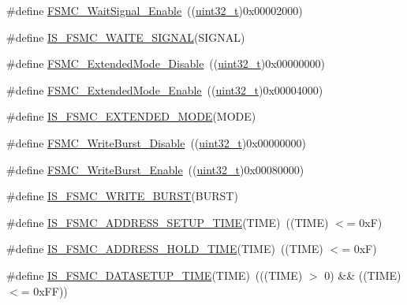 \begin{DoxyCompactItemize}
\item 
\#define \hyperlink{group___f_s_m_c___wait___signal_gaf809e339f1cdc9d0a815fd98712e9ee3}{F\+S\+M\+C\+\_\+\+Wait\+Signal\+\_\+\+Enable}~((\hyperlink{_p_e___types_8h_a33594304e786b158f3fb30289278f5af}{uint32\+\_\+t})0x00002000)
\item 
\#define \hyperlink{group___f_s_m_c___wait___signal_gae617db4f15c82850d4f5c927f9a7db3e}{I\+S\+\_\+\+F\+S\+M\+C\+\_\+\+W\+A\+I\+T\+E\+\_\+\+S\+I\+G\+N\+AL}(S\+I\+G\+N\+AL)
\item 
\#define \hyperlink{group___f_s_m_c___extended___mode_ga5a1f1acdc44328158f59012748980dd3}{F\+S\+M\+C\+\_\+\+Extended\+Mode\+\_\+\+Disable}~((\hyperlink{_p_e___types_8h_a33594304e786b158f3fb30289278f5af}{uint32\+\_\+t})0x00000000)
\item 
\#define \hyperlink{group___f_s_m_c___extended___mode_gaef9ff4c81a52fdb0471d2c4422271d2a}{F\+S\+M\+C\+\_\+\+Extended\+Mode\+\_\+\+Enable}~((\hyperlink{_p_e___types_8h_a33594304e786b158f3fb30289278f5af}{uint32\+\_\+t})0x00004000)
\item 
\#define \hyperlink{group___f_s_m_c___extended___mode_ga79849ea07bf2a8f09989a6babd9e66e2}{I\+S\+\_\+\+F\+S\+M\+C\+\_\+\+E\+X\+T\+E\+N\+D\+E\+D\+\_\+\+M\+O\+DE}(M\+O\+DE)
\item 
\#define \hyperlink{group___f_s_m_c___write___burst_ga65a49ecd05b3a128e8908c6a625adae7}{F\+S\+M\+C\+\_\+\+Write\+Burst\+\_\+\+Disable}~((\hyperlink{_p_e___types_8h_a33594304e786b158f3fb30289278f5af}{uint32\+\_\+t})0x00000000)
\item 
\#define \hyperlink{group___f_s_m_c___write___burst_ga1b2b66a0eb42778c2cc9a05003cf7655}{F\+S\+M\+C\+\_\+\+Write\+Burst\+\_\+\+Enable}~((\hyperlink{_p_e___types_8h_a33594304e786b158f3fb30289278f5af}{uint32\+\_\+t})0x00080000)
\item 
\#define \hyperlink{group___f_s_m_c___write___burst_gab7b03a33fab765827832abbf07d01a10}{I\+S\+\_\+\+F\+S\+M\+C\+\_\+\+W\+R\+I\+T\+E\+\_\+\+B\+U\+R\+ST}(B\+U\+R\+ST)
\item 
\#define \hyperlink{group___f_s_m_c___address___setup___time_ga8b77d090338011abc1be7f4a420e2d8f}{I\+S\+\_\+\+F\+S\+M\+C\+\_\+\+A\+D\+D\+R\+E\+S\+S\+\_\+\+S\+E\+T\+U\+P\+\_\+\+T\+I\+ME}(T\+I\+ME)~((T\+I\+ME) $<$= 0x\+F)
\item 
\#define \hyperlink{group___f_s_m_c___address___hold___time_gae7d031a5b95ad00acf67e9bc95064998}{I\+S\+\_\+\+F\+S\+M\+C\+\_\+\+A\+D\+D\+R\+E\+S\+S\+\_\+\+H\+O\+L\+D\+\_\+\+T\+I\+ME}(T\+I\+ME)~((T\+I\+ME) $<$= 0x\+F)
\item 
\#define \hyperlink{group___f_s_m_c___data___setup___time_ga3d923de775489e844913b29e77e8cca7}{I\+S\+\_\+\+F\+S\+M\+C\+\_\+\+D\+A\+T\+A\+S\+E\+T\+U\+P\+\_\+\+T\+I\+ME}(T\+I\+ME)~(((T\+I\+ME) $>$ 0) \&\& ((T\+I\+ME) $<$= 0x\+F\+F))

\end{DoxyCompactItemize}
